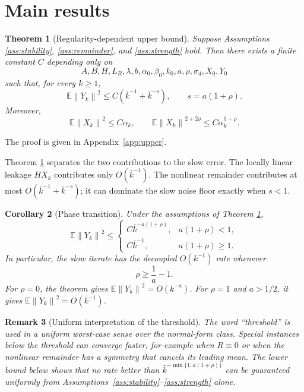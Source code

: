 \documentclass{article}
\newtheorem{theorem}{Theorem}[section]
\newtheorem{corollary}[theorem]{Corollary}
\newtheorem{remark}[theorem]{Remark}
\newcommand{\E}{\mathbb{E}}
\newcommand{\norm}[1]{\left\lVert #1\right\rVert}
\begin{document}
\section{Main results}

\begin{theorem}[Regularity-dependent upper bound]\label{thm:upper}
Suppose Assumptions \ref{ass:stability}, \ref{ass:remainder}, and \ref{ass:strength} hold. Then there exists a finite constant $C$ depending only on
\[
  A,B,H,L_R,\lambda,b,\alpha_0,\beta_0,k_0,a,\rho,\sigma_4,X_0,Y_0
\]
such that, for every $k\ge1$,
\begin{equation}
  \E\norm{Y_k}^2
  \le C\left(\bar k^{-1}+\bar k^{-s}\right),
  \qquad s=a(1+\rho). \label{eq:upper-bound}
\end{equation}
Moreover,
\begin{equation}
  \E\norm{X_k}^2\le C\alpha_k,
  \qquad
  \E\norm{X_k}^{2+2\rho}\le C\alpha_k^{1+\rho}. \label{eq:fast-moments-main}
\end{equation}
\end{theorem}

The proof is given in Appendix~\ref{app:upper}.

Theorem \ref{thm:upper} separates the two contributions to the slow error. The locally linear leakage $HX_k$ contributes only $O(\bar k^{-1})$. The nonlinear remainder contributes at most $O(\bar k^{-1}+\bar k^{-s})$; it can dominate the slow noise floor exactly when $s<1$.

\begin{corollary}[Phase transition]\label{cor:phase}
Under the assumptions of Theorem \ref{thm:upper},
\begin{equation}
  \E\norm{Y_k}^2 \le
  \begin{cases}
    C\bar k^{-a(1+\rho)}, & a(1+\rho)<1,\\[2mm]
    C\bar k^{-1}, & a(1+\rho)\ge1.
  \end{cases} \label{eq:phase-upper}
\end{equation}
In particular, the slow iterate has the decoupled $O(k^{-1})$ rate whenever
\begin{equation}
  \rho\ge \frac{1}{a}-1. \label{eq:threshold}
\end{equation}
For $\rho=0$, the theorem gives $\E\norm{Y_k}^2=O(k^{-a})$. For $\rho=1$ and $a>1/2$, it gives $\E\norm{Y_k}^2=O(k^{-1})$.
\end{corollary}

\begin{remark}[Uniform interpretation of the threshold]\label{rem:uniform-threshold}
The word ``threshold'' is used in a uniform worst-case sense over the normal-form class. Special instances below the threshold can converge faster, for example when $R\equiv0$ or when the nonlinear remainder has a symmetry that cancels its leading mean. The lower bound below shows that no rate better than $\bar k^{-\min\{1,a(1+\rho)\}}$ can be guaranteed uniformly from Assumptions~\ref{ass:stability}--\ref{ass:strength} alone.
\end{remark}
\end{document}
